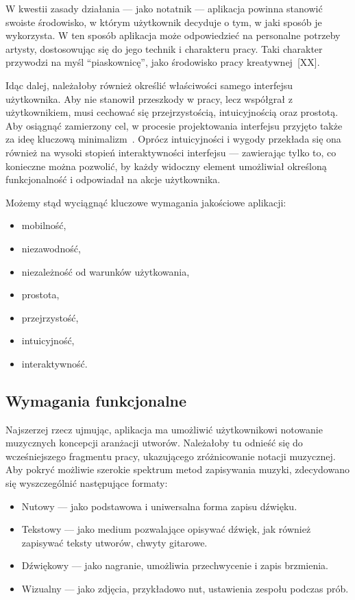 \documentclass[12pt]{article}
\begin{document}
W kwestii zasady działania — jako notatnik — aplikacja powinna stanowić swoiste środowisko,
w którym użytkownik decyduje o tym, w jaki sposób je wykorzysta.
W ten sposób aplikacja może odpowiedzieć na personalne potrzeby artysty, dostosowując się do jego technik i charakteru pracy.
Taki charakter przywodzi na myśl \enquote{piaskownicę}, jako środowisko pracy kreatywnej~[XX].

Idąc dalej, należałoby również określić właściwości samego interfejsu użytkownika.
Aby nie stanowił przeszkody w pracy, lecz współgrał z użytkownikiem, musi cechować się przejrzystością,
intuicyjnością oraz prostotą.
Aby osiągnąć zamierzony cel, w procesie projektowania interfejsu przyjęto także za ideę kluczową minimalizm~\cite{minimalism}.
Oprócz intuicyjności i wygody przekłada się ona również na wysoki stopień interaktywności interfejsu — zawierając tylko to,
co konieczne można pozwolić, by każdy widoczny element umożliwiał określoną funkcjonalność i odpowiadał na akcje użytkownika.

Możemy stąd wyciągnąć kluczowe wymagania jakościowe aplikacji:
\begin{itemize}
	\item mobilność,
	\item niezawodność,
	\item niezależność od warunków użytkowania,
	\item prostota,
	\item przejrzystość,
	\item intuicyjność,
	\item interaktywność.
\end{itemize}

\subsection{Wymagania funkcjonalne}
Najszerzej rzecz ujmując, aplikacja ma umożliwić użytkownikowi notowanie muzycznych koncepcji aranżacji utworów.
Należałoby tu odnieść się do wcześniejszego fragmentu pracy, ukazującego zróżnicowanie notacji muzycznej.
Aby pokryć możliwie szerokie spektrum metod zapisywania muzyki, zdecydowano się wyszczególnić następujące formaty:
\begin{itemize}
	\item Nutowy — jako podstawowa i uniwersalna forma zapisu dźwięku.
	\item Tekstowy — jako medium pozwalające opisywać dźwięk, jak również zapisywać teksty utworów, chwyty gitarowe.
	\item Dźwiękowy — jako nagranie, umożliwia przechwycenie i zapis brzmienia.
	\item Wizualny — jako zdjęcia, przykładowo nut, ustawienia zespołu podczas prób.
\end{itemize}
\end{document}
